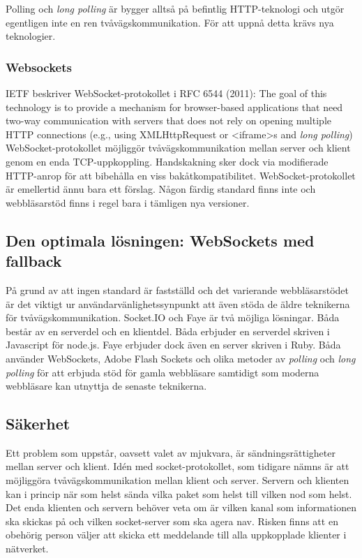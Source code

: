 Polling och \emph{long polling} är bygger alltså på befintlig HTTP-teknologi och utgör egentligen inte en ren tvåvägskommunikation. För att uppnå detta krävs nya teknologier.

\subsubsection{Websockets}
IETF beskriver WebSocket-protokollet i RFC 6544 (2011):
The goal of this technology is to provide a mechanism for browser-based applications that need two-way communication with servers that does not rely on opening multiple HTTP connections (e.g., using XMLHttpRequest or <iframe>s and \emph{long polling})
WebSocket-protokollet möjliggör tvåvägskommunikation mellan server och klient genom en enda TCP-uppkoppling. Handskakning sker dock via modifierade HTTP-anrop för att bibehålla en viss bakåtkompatibilitet.
WebSocket-protokollet är emellertid ännu bara ett förslag. Någon färdig standard finns inte och webbläsarstöd finns i regel bara i tämligen nya versioner.

\subsection{Den optimala lösningen: WebSockets med fallback}
På grund av att ingen standard är fastställd och det varierande webbläsarstödet är det viktigt ur användarvänlighetssynpunkt att även stöda de äldre teknikerna för tvåvägskommunikation.
Socket.IO och Faye är två möjliga lösningar. Båda består av en serverdel och en klientdel. Båda erbjuder en serverdel skriven i Javascript för node.js. Faye erbjuder dock även en server skriven i Ruby.
Båda använder WebSockets, Adobe Flash Sockets och olika metoder av \emph{polling} och \emph{long polling} för att erbjuda stöd för gamla webbläsare samtidigt som moderna webbläsare kan utnyttja de senaste teknikerna.

\subsection{Säkerhet}
Ett problem som uppstår, oavsett valet av mjukvara, är sändningsrättigheter mellan server och klient. Idén med socket-protokollet, som tidigare nämns är att möjliggöra tvåvägskommunikation mellan klient och server. Servern och klienten kan i princip när som helst sända vilka paket som helst till vilken nod som helst. Det enda klienten och servern behöver veta om är vilken kanal som informationen ska skickas på och vilken socket-server som ska agera nav. Risken finns att en obehörig person väljer att skicka ett meddelande till alla uppkopplade klienter i nätverket.

